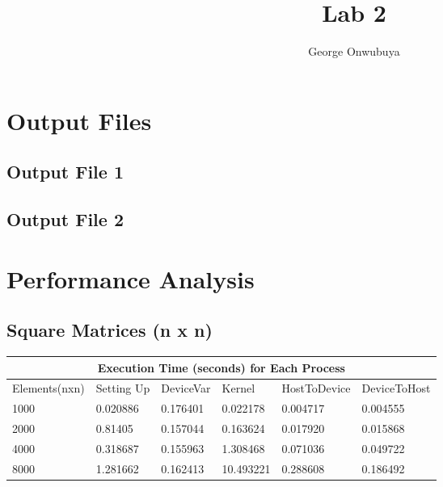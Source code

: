 \documentclass{article}
\title{Lab 2}
\author{George Onwubuya}
\begin{document}
\maketitle

\section{Output Files}
\subsection{Output File 1}

\subsection{Output File 2}

\section{Performance Analysis}
\subsection{Square Matrices (n x n)}

\begin{tabular}{ |p{2.5cm}||p{2cm}|p{2cm}|p{2cm}|p{2cm}|p{2cm}|  }
 \hline
 \multicolumn{6}{|c|}{Execution Time (seconds) for Each Process } \\
 \hline
 Elements(nxn) & Setting Up & DeviceVar & Kernel & HostToDevice & DeviceToHost\\
 \hline
 1000 & 0.020886 & 0.176401 & 0.022178 & 0.004717 & 0.004555\\
 \hline
 2000 & 0.81405 & 0.157044  & 0.163624 & 0.017920 & 0.015868\\
 \hline
 4000 & 0.318687 & 0.155963 & 1.308468 & 0.071036 & 0.049722\\
 \hline
 8000 & 1.281662  & 0.162413 & 10.493221 & 0.288608 & 0.186492 \\
  \hline
  \end{tabular}
  \\
  \\
  \\
\end{document}
